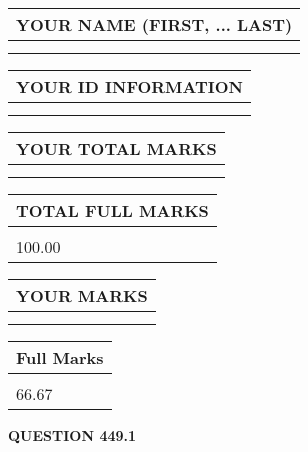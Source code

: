 \documentclass{ctexart}
\begin{document}
   
   
   
\newpage 
\setcounter{page}{ 
   449001 } 
   
   
   
   
\noindent\begin{tabular}{|l|}
\hline
YOUR NAME (FIRST, ... LAST)  \\
\hline
 \\ 
 \\ 
\hline
\end{tabular}
\hspace{0.05in} \begin{tabular}{|l|}
\hline
 YOUR   ID   INFORMATION  \\
\hline
 \\ 
 \\ 
\hline
\end{tabular}
   
   
\vspace{0.2in}\noindent\begin{tabular}{|l|}
\hline
YOUR TOTAL MARKS  \\
\hline
 \\ 
 \\ 
\hline
\end{tabular}
\hspace{0.05in} \begin{tabular}{|l|}
\hline
TOTAL FULL MARKS  \\
\hline
 \\ 
100.00 \\
\hline
\end{tabular}
   
   
 \vspace{0.2in}
 
 
 
 
   
   
  
\vspace{0.2in}
  
\noindent\begin{tabular}{|l|}
\hline
 YOUR MARKS  \\
\hline
 \\ 
 \\ 
\hline
\end{tabular}
\hspace{0.05in} \begin{tabular}{|l|}
\hline
 Full Marks  \\
\hline
 \\ 
66.67 \\
\hline
\end{tabular}
{\textbf{\Large{QUESTION
449.1 
}}}
  
\end{document}
